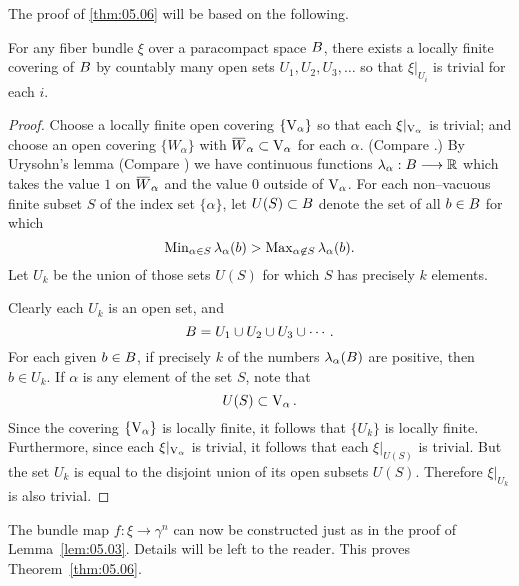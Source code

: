 \documentclass[../main]{subfiles}
\begin{document}
The proof of \ref{thm:05.06} will be based on the following.
\setcounter{theorem}{8}
\begin{lemma}
For any fiber bundle $\xi$ over a paracompact space $B$, there exists a locally finite covering of $B$ by countably many open sets $U_1, U_2, U_3, \ldots$ so that $\xi |_{U_i}$ is trivial for each $i$. 
\end{lemma}

\begin{proof}
Choose a locally finite open covering $\{\operatorname{V}_\alpha\}$ so that each $\xi |_{\operatorname{V}_\alpha}$ is trivial; and choose an open covering $\{W_\alpha\}$ with ${\xoverline W}_\alpha \subset \StiefelManifold_\alpha$ for each $\alpha$. (Compare \cite[p. 171]{kelley1955}.) By Urysohn's lemma (Compare \cite[\S33]{munkres2000topology}) we have continuous functions $\lambda_\alpha : B \longrightarrow \mathbb R$ which takes the value $1$ on ${\xoverline W}_\alpha$ and the value $0$ outside of $\operatorname{V}_\alpha$. For each non--vacuous finite subset $S$ of the index set $\{\alpha\}$, let $U(S) \subset B$ denote the set of all $b \in B$ for which \[\operatorname{Min}_{\alpha \in S} \lambda_\alpha(b) > \operatorname{Max}_{\alpha \not \in S} \lambda_\alpha(b).\] Let $U_k$ be the union of those sets $U(S)$ for which $S$ has precisely $k$ elements.

Clearly each $U_k$ is an open set, and \[B = U_1 \cup U_2 \cup U_3 \cup \cdots.\] For each given $b \in B$, if precisely $k$ of the numbers $\lambda_\alpha(B)$ are positive, then $b \in U_k$. If $\alpha$ is any element of the set $S$, note that \[U(S) \subset \operatorname{V}_\alpha.\] Since the covering $\{\operatorname{V}_\alpha\}$ is locally finite, it follows that $\{U_k\}$ is locally finite. Furthermore, since each $\xi |_{\operatorname{V}_\alpha}$ is trivial, it follows that each $\xi |_{U(S)}$ is trivial. But the set $U_k$ is equal to the disjoint union of its open subsets $U(S)$. Therefore $\xi |_{U_k}$ is also trivial. 
\end{proof}

The bundle map $f : \xi \longrightarrow \gamma^n$ can now be constructed just as in the proof of Lemma~\ref{lem:05.03}. Details will be left to the reader. This proves Theorem~\ref{thm:05.06}. 
\end{document}
